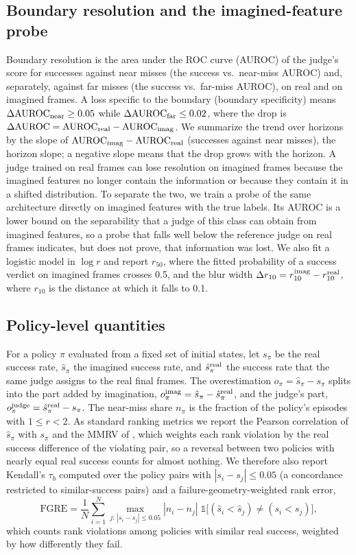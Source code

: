 \documentclass[10pt]{article}
\newcommand{\dauc}{\Delta\mathrm{AUROC}}
\begin{document}
\subsection{Boundary resolution and the imagined-feature probe}
Boundary resolution is the area under the ROC curve (AUROC) of the judge's score for successes against near misses (the success vs.\ near-miss AUROC) and, separately, against far misses (the success vs.\ far-miss AUROC), on real and on imagined frames. A loss specific to the boundary (boundary specificity) means $\dauc_{\rm near}\ge 0.05$ while $\dauc_{\rm far}\le0.02$, where the drop is $\dauc=\mathrm{AUROC}_{\rm real}-\mathrm{AUROC}_{\rm imag}$. We summarize the trend over horizons by the slope of $\mathrm{AUROC}_{\rm imag}-\mathrm{AUROC}_{\rm real}$ (successes against near misses), the horizon slope; a negative slope means that the drop grows with the horizon. A judge trained on real frames can lose resolution on imagined frames because the imagined features no longer contain the information or because they contain it in a shifted distribution. To separate the two, we train a probe of the same architecture directly on imagined features with the true labels. Its AUROC is a lower bound on the separability that a judge of this class can obtain from imagined features, so a probe that falls well below the reference judge on real frames indicates, but does not prove, that information was lost. We also fit a logistic model in $\log r$ and report $r_{50}$, where the fitted probability of a success verdict on imagined frames crosses 0.5, and the blur width $\Delta r_{10}=r^{\rm imag}_{10}-r^{\rm real}_{10}$, where $r_{10}$ is the distance at which it falls to 0.1.

\subsection{Policy-level quantities}
For a policy $\pi$ evaluated from a fixed set of initial states, let $s_\pi$ be the real success rate, $\hat s_\pi$ the imagined success rate, and $\hat s^{\rm real}_\pi$ the success rate that the same judge assigns to the real final frames. The overestimation $o_\pi=\hat s_\pi-s_\pi$ splits into the part added by imagination, $o^{\rm imag}_\pi=\hat s_\pi-\hat s^{\rm real}_\pi$, and the judge's part, $o^{\rm judge}_\pi=\hat s^{\rm real}_\pi-s_\pi$. The near-miss share $n_\pi$ is the fraction of the policy's episodes with $1\le r<2$. As standard ranking metrics we report the Pearson correlation of $\hat s_\pi$ with $s_\pi$ and the MMRV of \citet{li2024simpler}, which weights each rank violation by the real success difference of the violating pair, so a reversal between two policies with nearly equal real success counts for almost nothing. We therefore also report Kendall's $\tau_b$ computed over the policy pairs with $|s_i-s_j|\le0.05$ (a concordance restricted to similar-success pairs) and a failure-geometry-weighted rank error,
\begin{equation}
\mathrm{FGRE}=\frac1N\sum_{i=1}^{N} \max_{j:\,|s_i-s_j|\le 0.05} |n_i-n_j|\;\mathbb{1}\big[(\hat s_i<\hat s_j)\neq(s_i<s_j)\big],
\end{equation}
which counts rank violations among policies with similar real success, weighted by how differently they fail.
\end{document}
